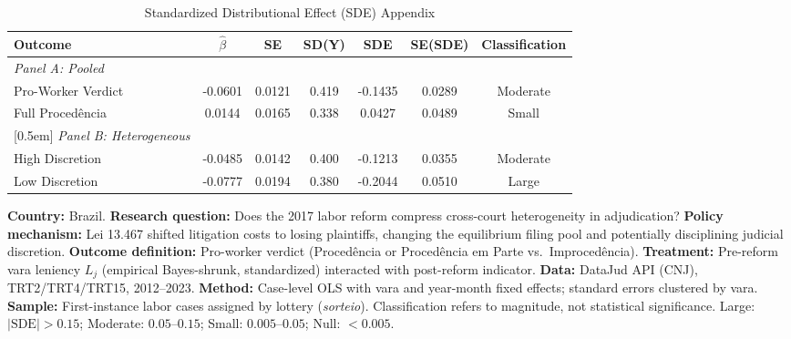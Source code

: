 \begin{table}[t]
\centering
\caption{Standardized Distributional Effect (SDE) Appendix}
\label{tab:sde}
\begin{adjustbox}{max width=\textwidth}
\begin{tabular}{lcccccc}
\hline\hline
Outcome & $\hat{\beta}$ & SE & SD(Y) & SDE & SE(SDE) & Classification \\
\hline
\textit{Panel A: Pooled} & & & & & & \\
Pro-Worker Verdict & -0.0601 & 0.0121 & 0.419 & -0.1435 & 0.0289 & Moderate \\
Full Proced\^{e}ncia & 0.0144 & 0.0165 & 0.338 & 0.0427 & 0.0489 & Small \\
{}[0.5em]
\textit{Panel B: Heterogeneous} & & & & & & \\
High Discretion & -0.0485 & 0.0142 & 0.400 & -0.1213 & 0.0355 & Moderate \\
Low Discretion & -0.0777 & 0.0194 & 0.380 & -0.2044 & 0.0510 & Large \\
\hline\hline
\end{tabular}
\end{adjustbox}
\begin{flushleft}\small
\textbf{Country:} Brazil.
\textbf{Research question:} Does the 2017 labor reform compress cross-court heterogeneity in adjudication?
\textbf{Policy mechanism:} Lei 13.467 shifted litigation costs to losing plaintiffs, changing the equilibrium filing pool and potentially disciplining judicial discretion.
\textbf{Outcome definition:} Pro-worker verdict (Proced\^{e}ncia or Proced\^{e}ncia em Parte vs.\ Improced\^{e}ncia).
\textbf{Treatment:} Pre-reform vara leniency $L_j$ (empirical Bayes-shrunk, standardized) interacted with post-reform indicator.
\textbf{Data:} DataJud API (CNJ), TRT2/TRT4/TRT15, 2012--2023.
\textbf{Method:} Case-level OLS with vara and year-month fixed effects; standard errors clustered by vara.
\textbf{Sample:} First-instance labor cases assigned by lottery (\textit{sorteio}).
Classification refers to magnitude, not statistical significance. Large: $|\text{SDE}| > 0.15$; Moderate: $0.05$--$0.15$; Small: $0.005$--$0.05$; Null: $< 0.005$.
\end{flushleft}
\end{table}

